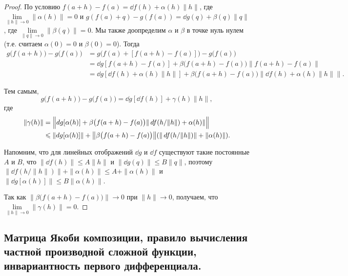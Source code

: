 \documentclass[a4paper]{article}
\theoremstyle{named}
\begin{document}
    \begin{proof}
        По условию
        $f(a+h)-f(a) = \dd f(h) + \alpha(h)\|h\|$, где $\lim\limits_{\|h\|\to0}\|\alpha(h)\|=0$
        и $g(f(a)+q) - g(f(a)) = \dd g(q)+\beta(q)\|q\|$, где $\lim\limits_{\|q\|\to0}\|\beta(q)\|=0$.
        Мы также доопределим $\alpha$ и $\beta$ в точке нуль нулем (т.е. считаем $\alpha(0)=0$ и $\beta(0)=0$).
        Тогда
        \begin{align*}
            g\bigl(f(a+h)\bigr) - g\bigl(f(a)\bigr) 
            &= g\bigl(f(a) + [f(a+h)-f(a)]\bigr) - g\bigl(f(a)\bigr) \\
            &= \dd g[f(a+h)-f(a)] + \beta\bigl(f(a+h)-f(a)\bigr)\|f(a+h)-f(a)\| \\
            &= \dd g[\dd f(h) + \alpha(h)\|h\|] + \beta\bigl(f(a+h)-f(a)\bigr)\|\dd f(h) + \alpha(h)\|h\|\|.
        \end{align*}

        Тем самым,
        $$
            g\bigl(f(a+h)\bigr) - g\bigl(f(a)\bigr) = \dd g[\dd f(h)] + \gamma(h)\|h\|,
        $$
        где
        \begin{align*}
            \|\gamma(h)\|
            &= \Bigl\|dg[\alpha(h)] +  \beta\bigl(f(a+h)-f(a)\bigr)\|\mathop{}\!d f(h/\|h\|) + \alpha(h)\| \Bigr\| \\
            &\leqslant \|dg[\alpha(h)]\| + \bigl\|\beta\bigl(f(a+h)-f(a)\bigr)\bigr\| (\|\mathop{}\!d f(h/\|h\|)\| + \|\alpha(h)\|).
        \end{align*}

        Напомним, что для линейных отображений $\dd g$ и $\dd f$ существуют такие постоянные $A$ и $B$, что
        $\|\dd f(h)\|\leq A\|h\|$ и $\|\dd g(q)\|\leq B\|q\|$,
        поэтому $\|\dd f(h/\|h\|)\| + \|\alpha(h)\|\leq A + \|\alpha(h)\|$ и $\|\dd g[\alpha(h)]\|\leq B\|\alpha(h)\|$.

        Так как $\bigl\|\beta\bigl(f(a+h)-f(a)\bigr)\bigr\|\to0$ при $\|h\|\to 0$, получаем, что $\lim\limits_{\|h\|\to0}\|\gamma(h)\|=0$.
    \end{proof}

    \subsection{Матрица Якоби композиции, правило вычисления частной производной сложной функции, инвариантность первого дифференциала.}
\end{document}
